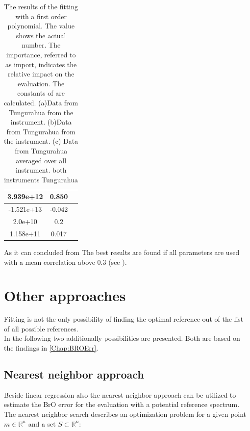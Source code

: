 \documentclass  [
  paper    = a4,
  BCOR     = 10mm,
  twoside,
  fontsize = 12pt,
  fleqn,
  toc      = bibnumbered,
  toc      = listofnumbered,
  numbers  = noendperiod,
  headings = normal,
  listof   = leveldown,
  version  = 3.03
]                                       {scrreprt}
\begin{document}
\begin{table}[h!]
{\begin{tabular}{c|c|c}
			\toprule
			3.939e+12&0.850\\
			\midrule
			-1.521e+13&-0.042\\
			\midrule
			2.0e+10&0.2 \\
			\midrule
			1.158e+11&0.017\\
			\midrule
			\bottomrule
	\end{tabular}}
		\label{tab:coefTung}
		\caption{The results of the fitting with a first order polynomial. The value shows the actual number. The importance,  referred to as
			import,  indicates the relative impact on the evaluation.
			The constants of  are calculated.
			(a)Data from Tungurahua  from the instrument. 
			(b)Data from Tungurahua from the  instrument. %
			(c) Data from Tungurahua averaged over all instrument.  %
			 both instruments Tungurahua%
		 }
	\end{table}			
	As it can concluded from  The best results are found if all parameters are used with a mean correlation above 0.3 (see ).
	
	\section{Other approaches}

	Fitting is not the only possibility of finding the optimal reference out of the list of all possible references.\\
	In the following two additionally possibilities are presented. Both are based on the findings in \cref{Chap:BROErr}. 

\subsection{Nearest neighbor approach}


Beside linear regression also the nearest neighbor approach can be utilized to estimate the BrO error for the evaluation with a potential reference spectrum.
%
The nearest neighbor search describes an optimization problem for a given point $m \in \mathbb{R}^n$ and a set $S \subset \mathbb{R}^n$:
\end{document}
